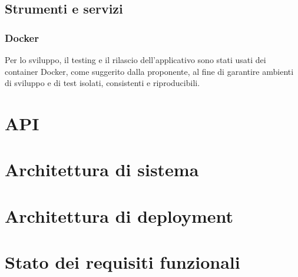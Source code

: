 \documentclass[10pt]{article}
\begin{document}
\begin{justify}
        

    \subsection{Strumenti e servizi}
        \subsubsection{Docker}
        Per lo sviluppo, il testing e il rilascio dell'applicativo sono stati usati dei container Docker, come suggerito dalla proponente, al fine di garantire ambienti di 
        sviluppo e di test isolati, consistenti e riproducibili.\\



\section{API}


\section{Architettura di sistema}


\section{Architettura di deployment}


\section{Stato dei requisiti funzionali}


\end{justify}
\end{document}
